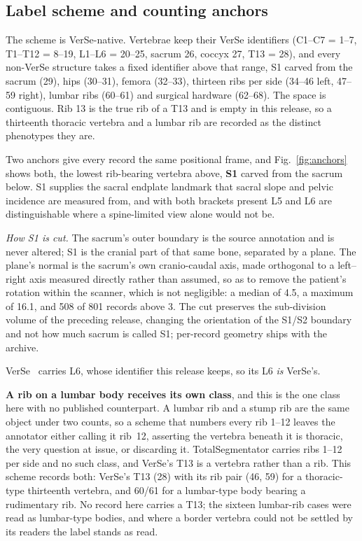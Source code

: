 \documentclass[aapm,mph,amsmath,amssymb,reprint]{revtex4-2}
\begin{document}
\subsection{Label scheme and counting anchors}\label{sec:anchors}

The scheme is VerSe-native. Vertebrae keep their VerSe identifiers (C1--C7 = 1--7,
T1--T12 = 8--19, L1--L6 = 20--25, sacrum 26, coccyx 27, T13 = 28), and every non-VerSe
structure takes a fixed identifier above that range, S1 carved from the sacrum (29), hips (30--31), femora (32--33), thirteen ribs per side (34--46 left, 47--59 right), lumbar ribs (60--61) and surgical hardware (62--68). The space is contiguous. Rib 13 is the true rib of a T13 and is empty in this release, so a thirteenth thoracic vertebra and a lumbar rib are recorded as the distinct phenotypes they are.

Two anchors give every record the same positional frame, and Fig.~\ref{fig:anchors} shows both, the lowest rib-bearing vertebra above, \textbf{S1} carved from the sacrum below.  S1 supplies the sacral endplate
landmark that sacral slope and pelvic incidence are measured from, and with both brackets
present L5 and L6 are distinguishable where a spine-limited view alone would not be.

\emph{How S1 is cut.} The sacrum's outer boundary is the source annotation and is never
altered; S1 is the cranial part of that same bone, separated by a plane. The plane's normal
is the sacrum's own cranio-caudal axis, made orthogonal to a left--right axis
measured directly rather than assumed, so as to remove the patient's rotation within the scanner, which is not negligible: a median
of 4.5\textdegree{}, a maximum of 16.1\textdegree{}, and 508 of 801 records above
3\textdegree{}. The cut preserves the sub-division volume of the preceding release, changing the
orientation of the S1/S2 boundary and not how much sacrum is called S1; per-record geometry
ships with the archive.

VerSe~\cite{verse2021} carries L6, whose identifier this release keeps, so its L6 \emph{is} VerSe's.

\textbf{A rib on a lumbar body receives its own class}, and this is the one class here with
no published counterpart. A lumbar rib and a stump rib are the same object under two counts,
so a scheme that numbers every rib 1--12 leaves the annotator either calling it rib~12,
asserting the vertebra beneath it is thoracic, the very question at issue, or discarding
it. TotalSegmentator carries ribs 1--12 per side and no such class, and
VerSe's T13 is a vertebra rather than a rib. This scheme records both: VerSe's T13 (28) with its rib pair (46, 59) for a thoracic-type
thirteenth vertebra, and 60/61 for a lumbar-type body bearing a rudimentary rib. No record here carries a T13; the sixteen lumbar-rib cases were read as lumbar-type
bodies, and where a border vertebra could not be settled by its readers the label stands as
read.
\end{document}
